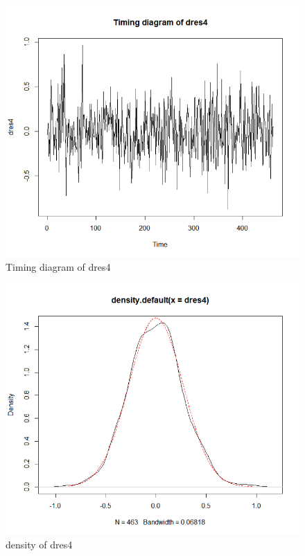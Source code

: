 \documentclass[a4paper,11pt]{article}
\begin{document}
\begin{figure}[H]
\centering
\caption{Timing diagram of dres4}
\includegraphics[scale=.80]{Picture13.png}
\end{figure}

\begin{figure}[H]
\centering
\caption{density of dres4}
\includegraphics[scale=.80]{Picture14.png}
\end{figure}
\end{document}
